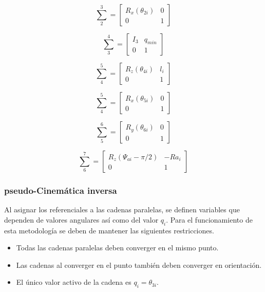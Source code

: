 \documentclass[letterpaper, 12pt]{article}
\begin{document}
\begin{equation}
\sum_2^3 = \begin{bmatrix}
R_x(\theta_{2i}) & 0\\
0 & 1
\end{bmatrix}
\end{equation}

\begin{equation}
\sum_3^4 = \begin{bmatrix}
I_3 & q_{min}\\
0 & 1
\end{bmatrix}
\end{equation}

\begin{equation}
\sum_4^5 = \begin{bmatrix}
R_z(\theta_{4i}) & l_i\\
0 & 1
\end{bmatrix}
\end{equation}

\begin{equation}
\sum_4^5 = \begin{bmatrix}
R_x(\theta_{5i}) & 0\\
0 & 1
\end{bmatrix}
\end{equation}

\begin{equation}
\sum_5^6 = \begin{bmatrix}
R_y(\theta_{6i}) & 0\\
0 & 1
\end{bmatrix}
\end{equation}

\begin{equation}
\sum_6^7 = \begin{bmatrix}
R_z(\Psi_{ai} - \pi/2) & -Ra_i\\
0 & 1
\end{bmatrix}
\end{equation}

\subsubsection{pseudo-Cinemática inversa}
Al asignar los referenciales a las cadenas paralelas, se definen variables que dependen de 
valores angulares así como del valor $q_i$. Para el funcionamiento de esta metodología se 
deben de mantener las siguientes restricciones.

\begin{itemize}
  \item Todas las cadenas paralelas deben converger en el mismo punto.
  \item Las cadenas al converger en el punto también deben converger en orientación.
  \item El único valor activo de la cadena es $q_i = \theta_{3i}$.
\end{itemize}
\end{document}
